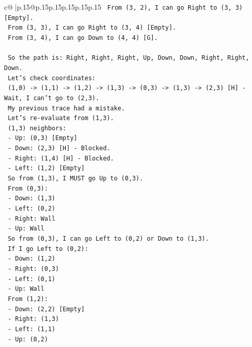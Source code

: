\documentclass{article}
\begin{document}
{\begin{supertabular}{c@{$\;$}|p{.15\linewidth}@{}p{.15\linewidth}p{.15\linewidth}p{.15\linewidth}p{.15\linewidth}p{.15\linewidth}}
{{{\texttt{   From (3, 2), I can go Right to (3, 3) {[}Empty{]}.} \\
\texttt{   From (3, 3), I can go Right to (3, 4) {[}Empty{]}.} \\
\texttt{   From (3, 4), I can go Down to (4, 4) {[}G{]}.} \\
\\ 
\texttt{   So the path is: Right, Right, Right, Up, Down, Down, Right, Right, Down.} \\
\texttt{   Let's check coordinates:} \\
\texttt{   (1,0) {-}> (1,1) {-}> (1,2) {-}> (1,3) {-}> (0,3) {-}> (1,3) {-}> (2,3) {[}H{]} {-} Wait, I can't go to (2,3).} \\
\texttt{   My previous trace had a mistake.} \\
\texttt{   Let's re{-}evaluate from (1,3).} \\
\texttt{   (1,3) neighbors:} \\
\texttt{     {-} Up: (0,3) {[}Empty{]}} \\
\texttt{     {-} Down: (2,3) {[}H{]} {-} Blocked.} \\
\texttt{     {-} Right: (1,4) {[}H{]} {-} Blocked.} \\
\texttt{     {-} Left: (1,2) {[}Empty{]}} \\
\texttt{   So from (1,3), I MUST go Up to (0,3).} \\
\texttt{   From (0,3):} \\
\texttt{     {-} Down: (1,3)} \\
\texttt{     {-} Left: (0,2)} \\
\texttt{     {-} Right: Wall} \\
\texttt{     {-} Up: Wall} \\
\texttt{   So from (0,3), I can go Left to (0,2) or Down to (1,3).} \\
\texttt{   If I go Left to (0,2):} \\
\texttt{     {-} Down: (1,2)} \\
\texttt{     {-} Right: (0,3)} \\
\texttt{     {-} Left: (0,1)} \\
\texttt{     {-} Up: Wall} \\
\texttt{   From (1,2):} \\
\texttt{     {-} Down: (2,2) {[}Empty{]}} \\
\texttt{     {-} Right: (1,3)} \\
\texttt{     {-} Left: (1,1)} \\
\texttt{     {-} Up: (0,2)} \\
}}}
\end{supertabular}}
\end{document}

